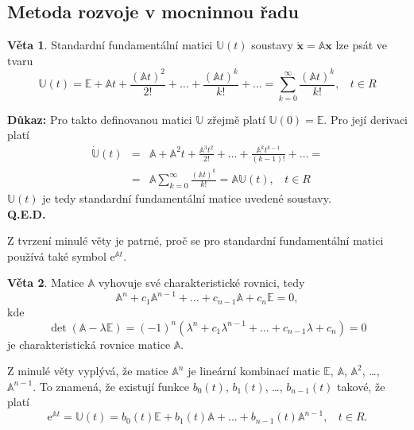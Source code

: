 \documentclass[a4paper, 12pt]{book}
\theoremstyle{definition}
\newtheorem{theorem}{Věta}[section]
\def\vc#1{\mathbf{\boldsymbol{#1}}}     %
\def\tn#1{{\mathbb{#1}}}    %
\begin{document}
\subsection{Metoda rozvoje v mocninnou řadu}
\begin{theorem}
Standardní fundamentální matici ${\tn U}(t)$ soustavy 
$\dot{\vc x}={\tn A}\vc x$ lze psát ve tvaru
\begin{equation}
{\tn U}(t) = {\tn E}+{\tn A}t+\frac{({\tn A}t)^2}{2!}+\dots+\frac{({\tn A}t)^k}{k!}+\dots=\sum_{k=0}^\infty\frac{({\tn A}t)^k}{k!}, ~~~~t\in R
\end{equation}
\end{theorem}
{\bf Důkaz:}
Pro takto definovanou matici $\tn U$ zřejmě platí ${\tn U}(0)={\tn E}$. Pro 
její derivaci platí
\begin{eqnarray*}
\dot{\tn U}(t) &=& {\tn A}+{\tn A}^2t+\frac{{\tn A}^3t^2}{2!}+\dots+\frac{{\tn A}^kt^{k-1}}{(k-1)!}+\dots=\\
&=&{\tn A}\sum_{k=0}^\infty\frac{({\tn A}t)^k}{k!}={\tn A}{\tn U}(t), ~~~~t\in R
\end{eqnarray*}
${\tn U}(t)$ je tedy standardní fundamentální matice uvedené soustavy.\\
{\bf Q.E.D.}

Z tvrzení minulé věty je patrné, proč se pro standardní fundamentální matici 
používá také symbol $\mathrm{e}^{{\tn A}t}$.

\begin{theorem}
Matice ${\tn A}$ vyhovuje své charakteristické rovnici, tedy
\begin{equation}
{\tn A}^n+c_1{\tn A}^{n-1}+\dots+c_{n-1}{\tn A}+c_n{\tn E}=0,
\end{equation}
kde
\begin{equation}
\det({\tn A}-\lambda{\tn E}) = (-1)^n (\lambda^n+c_1\lambda^{n-1}+\dots+c_{n-1}\lambda+c_n) = 0
\end{equation}
je charakteristická rovnice matice $\tn A$.
\end{theorem}

Z minulé věty vyplývá, že matice ${\tn A}^n$ je lineární kombinací matic $\tn E$,
$\tn A$, ${\tn A}^2$, \dots, ${\tn A}^{n-1}$. To znamená, že existují funkce 
$b_0(t)$, $b_1(t)$, \dots, $b_{n-1}(t)$ takové, že platí
\begin{equation}\label{4.5.4}
\mathrm{e}^{{\tn A}t} = {\tn U}(t) = b_0(t){\tn E}+b_1(t){\tn A}+\dots+b_{n-1}(t){\tn A}^{n-1}, ~~~~t\in R.
\end{equation}
\end{document}
